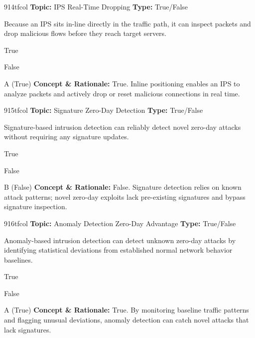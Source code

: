 \begin{qcard}{914}{tfcol}
\textcolor{darkslate!75}{\small\textbf{Topic:} IPS Real-Time Dropping \hfill \textbf{Type:} True/False}\vspace{0.4em}\par
Because an IPS sits in-line directly in the traffic path, it can inspect packets and drop malicious flows before they reach target servers.
\begin{qoptions}
\item True
\item False
\end{qoptions}
\end{qcard}
\nopagebreak
\begin{explainbox}{A (True)}
\textbf{Concept \& Rationale:} True. Inline positioning enables an IPS to analyze packets and actively drop or reset malicious connections in real time.
\end{explainbox}

\begin{qcard}{915}{tfcol}
\textcolor{darkslate!75}{\small\textbf{Topic:} Signature Zero-Day Detection \hfill \textbf{Type:} True/False}\vspace{0.4em}\par
Signature-based intrusion detection can reliably detect novel zero-day attacks without requiring any signature updates.
\begin{qoptions}
\item True
\item False
\end{qoptions}
\end{qcard}
\nopagebreak
\begin{explainbox}{B (False)}
\textbf{Concept \& Rationale:} False. Signature detection relies on known attack patterns; novel zero-day exploits lack pre-existing signatures and bypass signature inspection.
\end{explainbox}

\begin{qcard}{916}{tfcol}
\textcolor{darkslate!75}{\small\textbf{Topic:} Anomaly Detection Zero-Day Advantage \hfill \textbf{Type:} True/False}\vspace{0.4em}\par
Anomaly-based intrusion detection can detect unknown zero-day attacks by identifying statistical deviations from established normal network behavior baselines.
\begin{qoptions}
\item True
\item False
\end{qoptions}
\end{qcard}
\nopagebreak
\begin{explainbox}{A (True)}
\textbf{Concept \& Rationale:} True. By monitoring baseline traffic patterns and flagging unusual deviations, anomaly detection can catch novel attacks that lack signatures.
\end{explainbox}

